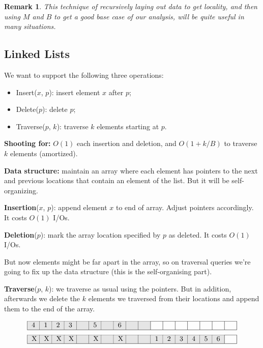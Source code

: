 \documentclass[11pt]{article}
\newtheorem{remark}[theorem]{Remark}
\begin{document}
\begin{remark}
  This technique of recursively laying out data to get locality, and
  then using $M$ and $B$ to get a good base case of our analysis, will
  be quite useful in many situations.
\end{remark}

\subsection{Linked Lists}

We want to support the following three operations: 
\begin{itemize}
\item Insert($x$, $p$): insert element $x$ after $p$;
\item Delete($p$): delete $p$;
\item Traverse($p$, $k$): traverse $k$ elements starting at $p$. 
\end{itemize}
\textbf{Shooting for:} $O(1)$ each insertion and deletion, and $O(1+k/B)$
to traverse $k$ elements (amortized).

\textbf{Data structure:} maintain an array where each element has pointers
to the next and previous locations that contain an element of the
list. But it will be self-organizing. 

\textbf{Insertion}($x$, $p$): append element $x$ to end of array. Adjust pointers accordingly. It costs $O(1)$ I/Os.

\textbf{Deletion}($p$): mark the array location specified by $p$ as deleted. It costs $O(1)$ I/Os.

But now elements might be far apart in the array, so on traversal
queries we're going to fix up the data structure (this is the
self-organising part).

\textbf{Traverse}($p$, $k$): we traverse as usual
using the pointers. But in addition, afterwards we delete the $k$
elements we traversed from their locations and append them to the end
of the array.

\[
\begin{tabular}{|p{5pt}|p{5pt}|p{5pt}|p{5pt}|p{5pt}|p{5pt}|p{5pt}|p{5pt}|p{5pt}|p{5pt}|p{5pt}|p{5pt}|p{5pt}|p{5pt}|p{5pt}|p{5pt}|p{5pt}|}
  \hline \cellcolor{Gray}4 & \cellcolor{Gray}1 & \cellcolor{Gray}2 & \cellcolor{Gray}3 &\cellcolor{Gray}
   \ \ & \cellcolor{Gray}5 & \cellcolor{Gray}\ \ & \cellcolor{Gray}6 & \cellcolor{Gray}\ \ & \cellcolor{Gray}\ \
   \cellcolor{Gray} &\ \ & \ \ & \ \ & \ \ & \ \ & \ \ & \\ \hline
\end{tabular}
\]
\vspace{3pt}
\[
\begin{tabular}{|p{5pt}|p{5pt}|p{5pt}|p{5pt}|p{5pt}|p{5pt}|p{5pt}|p{5pt}|p{5pt}|p{5pt}|p{5pt}|p{5pt}|p{5pt}|p{5pt}|p{5pt}|p{5pt}|p{5pt}|}
  \hline \cellcolor{Gray}X & \cellcolor{Gray}X & \cellcolor{Gray}X & \cellcolor{Gray}X & 
  \cellcolor{Gray}\ \ & \cellcolor{Gray}X & \cellcolor{Gray}\ \ & \cellcolor{Gray}X & \cellcolor{Gray}\ \ &
  \cellcolor{Gray}\ \ & \cellcolor{Gray}1 & \cellcolor{Gray}2 & \cellcolor{Gray}3 &
  \cellcolor{Gray} 4 &\cellcolor{Gray} 5 &\cellcolor{Gray} 6 & \\ \hline
\end{tabular}
\]
\end{document}
